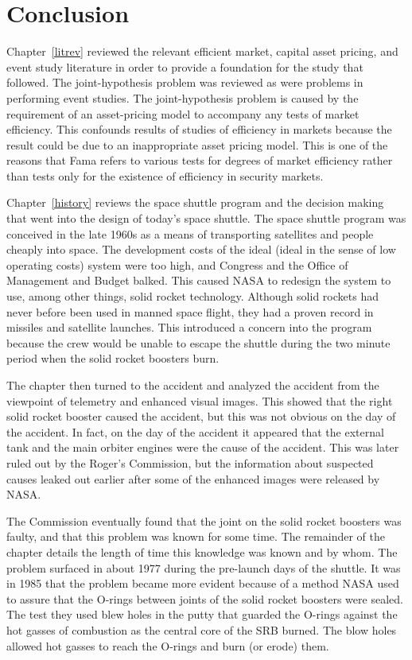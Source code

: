 \chapter{Conclusion}

Chapter~\ref{litrev} reviewed the relevant efficient market,
capital asset pricing, and event study literature in order
to provide a foundation for the study that followed.  The
joint-hypothesis problem was reviewed as were problems in
performing event studies.  The joint-hypothesis problem is
caused by the requirement of an asset-pricing model to
accompany
any tests of market efficiency.  This confounds results
of studies of efficiency in markets because the result could
be due to an inappropriate asset pricing model.  This is
one of the reasons that Fama refers to various tests for
degrees of market efficiency rather than tests only for the
existence of efficiency in security markets.

Chapter~\ref{history} reviews the space shuttle program and
the decision making that went into the design of today's
space shuttle.  The space shuttle program was conceived in
the late 1960s as a means of transporting satellites and
people cheaply into space.  The development costs of the
ideal (ideal in the sense of low operating costs) system
were too high, and Congress and the Office of Management and
Budget balked. This caused NASA to redesign the system to
use, among other things, solid rocket technology.  Although
solid rockets had never before been used in manned space
flight, they had a proven record in missiles and satellite
launches.  This introduced a concern into the program
because the crew would be unable to escape the shuttle
during the two minute period when the solid rocket boosters
burn.

The chapter then turned to the accident and analyzed the
accident from the viewpoint of telemetry and enhanced visual
images.  This showed that the right solid rocket booster 
caused the accident, but this was not obvious on the
day of the accident.  In fact, on the day of the accident it
appeared that the external tank and the main orbiter engines
were the cause of the accident.  This was later ruled out by
the Roger's Commission, but the information about suspected
causes leaked out earlier after some of the enhanced images
were released by NASA.

The Commission eventually found that the joint on the solid
rocket boosters was faulty, and that this problem was known for
some time.  The remainder of the chapter details the length
of time this knowledge was known and by whom.  The problem
surfaced in about 1977 during the pre-launch days of the
shuttle.  It was in 1985 that the problem became more
evident because of a method NASA used to assure that the O-rings
between joints of the solid rocket boosters were sealed. 
The test they used blew holes in the putty that guarded the
O-rings against the hot gasses of combustion as the central
core of the SRB burned.  The blow holes allowed hot gasses
to reach the O-rings and burn (or erode) them.

